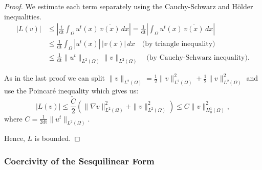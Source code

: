 \documentclass{article}
\theoremstyle{definition}
\theoremstyle{plain}
\newtheorem{lemma}[definition]{Lemma}
\theoremstyle{remark}
\newcommand{\dt}{\text{dt}}
\begin{document}

\begin{proof}
We estimate each term separately using the Cauchy-Schwarz and Hölder inequalities.
\begin{align*}
|L(v)| &\leq \left| \frac{i}{\dt} \int_\Omega u^{t}(x) \, \overline{v(x)} \, dx\right|= \frac{1}{\dt}\left| \int_\Omega u^{t}(x) \, \overline{v(x)} \, dx \right|\\
&\leq \frac{1}{\dt}\int_\Omega |u^{t}(x)| \, |v(x)| \, dx  \quad \text{(by triangle inequality)} \\
&\leq \frac{1}{\dt}\|u^{t}\|_{L^2(\Omega)} \|v\|_{L^2(\Omega)} \quad \text{(by Cauchy-Schwarz inequality)}.
\end{align*}


As in the last proof we can split $\|v\|_{L^2(\Omega)} = \frac{1}{2} \|v\|_{L^2(\Omega)}^2 + \frac{1}{2} \|v\|_{L^2(\Omega)}^2$ and use the Poincaré inequality which gives us:
\[
|L(v)| \leq \frac{\tilde{C}}{2} \left(\|\nabla v\|_{L^2(\Omega)}^2 + \|v\|_{L^2(\Omega)}^2 \right) \leq C \|v\|_{H_0^1(\Omega)}^2,
\]
where \( C = \frac{1}{2\dt}\|u^{t}\|_{L^2(\Omega)} \).

Hence, \( L \) is bounded.
\end{proof}

\subsubsection*{Coercivity of the Sesquilinear Form}
\end{document}
